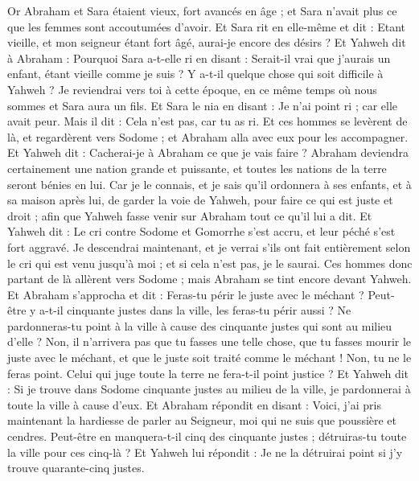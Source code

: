 \begin{multicols}{2}
Or Abraham et Sara étaient vieux, fort avancés en âge ; et Sara n'avait plus ce que les femmes sont accoutumées d'avoir.
Et Sara rit en elle-même et dit : Etant vieille, et mon seigneur étant fort âgé, aurai-je encore des désirs ?
Et Yahweh dit à Abraham : Pourquoi Sara a-t-elle ri en disant : Serait-il vrai que j'aurais un enfant, étant vieille comme je suis ?
Y a-t-il quelque chose qui soit difficile à Yahweh ? Je reviendrai vers toi à cette époque, en ce même temps où nous sommes et Sara aura un fils.
Et Sara le nia en disant : Je n'ai point ri ; car elle avait peur. Mais il dit : Cela n'est pas, car tu as ri.
Et ces hommes se levèrent de là, et regardèrent vers Sodome ; et Abraham alla avec eux pour les accompagner.
Et Yahweh dit : Cacherai-je à Abraham ce que je vais faire ?
Abraham deviendra certainement une nation grande et puissante, et toutes les nations de la terre seront bénies en lui.
Car je le connais, et je sais qu'il ordonnera à ses enfants, et à sa maison après lui, de garder la voie de Yahweh, pour faire ce qui est juste et droit ; afin que Yahweh fasse venir sur Abraham tout ce qu'il lui a dit.
Et Yahweh dit : Le cri contre Sodome et Gomorrhe s'est accru, et leur péché s'est fort aggravé.
Je descendrai maintenant, et je verrai s'ils ont fait entièrement selon le cri qui est venu jusqu'à moi ; et si cela n'est pas, je le saurai.
Ces hommes donc partant de là allèrent vers Sodome ; mais Abraham se tint encore devant Yahweh.
Et Abraham s'approcha et dit : Feras-tu périr le juste avec le méchant ?
Peut-être y a-t-il cinquante justes dans la ville, les feras-tu périr aussi ? Ne pardonneras-tu point à la ville à cause des cinquante justes qui sont au milieu d'elle ?
Non, il n'arrivera pas que tu fasses une telle chose, que tu fasses mourir le juste avec le méchant, et que le juste soit traité comme le méchant ! Non, tu ne le feras point. Celui qui juge toute la terre ne fera-t-il point justice ?
Et Yahweh dit : Si je trouve dans Sodome cinquante justes au milieu de la ville, je pardonnerai à toute la ville à cause d'eux.
Et Abraham répondit en disant : Voici, j'ai pris maintenant la hardiesse de parler au Seigneur, moi qui ne suis que poussière et cendres.
Peut-être en manquera-t-il cinq des cinquante justes ; détruiras-tu toute la ville pour ces cinq-là ? Et Yahweh lui répondit : Je ne la détruirai point si j'y trouve quarante-cinq justes.

\end{multicols}
